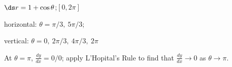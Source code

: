 {$\ds r=1+\cos\theta$;\quad $[0,2\pi]$}
{horizontal: $\theta=\pi/3,\ 5\pi/3$;

vertical: $\theta = 0,\ 2\pi/3,\ 4\pi/3,\ 2\pi$

At $\theta=\pi$, $\frac{dy}{dx} = 0/0$; apply L'Hopital's Rule to find that $\frac{dy}{dx}\rightarrow 0$ as $\theta\rightarrow \pi$. 
}
